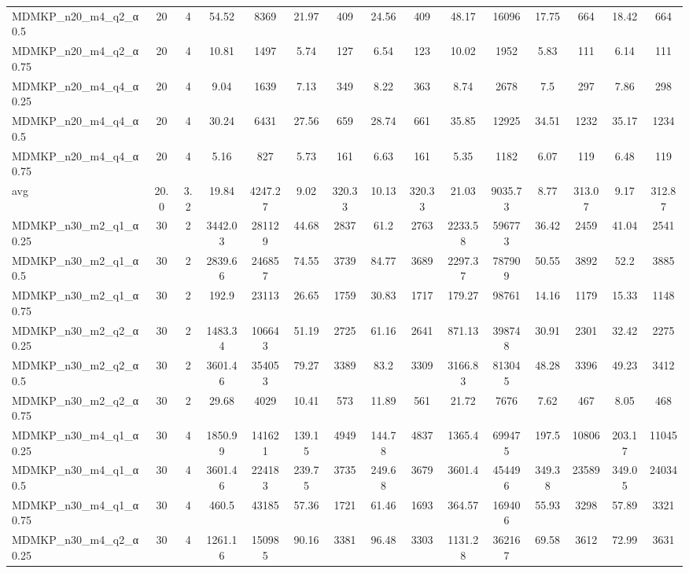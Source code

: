 \begin{table}[!ht]
{\begin{tabular}{lcccccccccccccc}
MDMKP\_n20\_m4\_q2\_α0.5 & 20 & 4 & 54.52 & 8369 & 21.97 & 409 & 24.56 & 409 & 48.17 & 16096 & 17.75 & 664 & 18.42 & 664 \\
MDMKP\_n20\_m4\_q2\_α0.75 & 20 & 4 & 10.81 & 1497 & 5.74 & 127 & 6.54 & 123 & 10.02 & 1952 & 5.83 & 111 & 6.14 & 111 \\
MDMKP\_n20\_m4\_q4\_α0.25 & 20 & 4 & 9.04 & 1639 & 7.13 & 349 & 8.22 & 363 & 8.74 & 2678 & 7.5 & 297 & 7.86 & 298 \\
MDMKP\_n20\_m4\_q4\_α0.5 & 20 & 4 & 30.24 & 6431 & 27.56 & 659 & 28.74 & 661 & 35.85 & 12925 & 34.51 & 1232 & 35.17 & 1234 \\
MDMKP\_n20\_m4\_q4\_α0.75 & 20 & 4 & 5.16 & 827 & 5.73 & 161 & 6.63 & 161 & 5.35 & 1182 & 6.07 & 119 & 6.48 & 119 \\
\hline avg & 20.0 & 3.2 & 19.84& 4247.27 & 9.02& 320.33 & 10.13& 320.33 & 21.03& 9035.73 & 8.77& 313.07 & 9.17& 312.87\\ \hline
MDMKP\_n30\_m2\_q1\_α0.25 & 30 & 2 & 3442.03 & 281129 & 44.68 & 2837 & 61.2 & 2763 & 2233.58 & 596773 & 36.42 & 2459 & 41.04 & 2541 \\
MDMKP\_n30\_m2\_q1\_α0.5 & 30 & 2 & 2839.66 & 246857 & 74.55 & 3739 & 84.77 & 3689 & 2297.37 & 787909 & 50.55 & 3892 & 52.2 & 3885 \\
MDMKP\_n30\_m2\_q1\_α0.75 & 30 & 2 & 192.9 & 23113 & 26.65 & 1759 & 30.83 & 1717 & 179.27 & 98761 & 14.16 & 1179 & 15.33 & 1148 \\
MDMKP\_n30\_m2\_q2\_α0.25 & 30 & 2 & 1483.34 & 106643 & 51.19 & 2725 & 61.16 & 2641 & 871.13 & 398748 & 30.91 & 2301 & 32.42 & 2275 \\
MDMKP\_n30\_m2\_q2\_α0.5 & 30 & 2 & 3601.46 & 354053 & 79.27 & 3389 & 83.2 & 3309 & 3166.83 & 813045 & 48.28 & 3396 & 49.23 & 3412 \\
MDMKP\_n30\_m2\_q2\_α0.75 & 30 & 2 & 29.68 & 4029 & 10.41 & 573 & 11.89 & 561 & 21.72 & 7676 & 7.62 & 467 & 8.05 & 468 \\
MDMKP\_n30\_m4\_q1\_α0.25 & 30 & 4 & 1850.99 & 141621 & 139.15 & 4949 & 144.78 & 4837 & 1365.4 & 699475 & 197.5 & 10806 & 203.17 & 11045 \\
MDMKP\_n30\_m4\_q1\_α0.5 & 30 & 4 & 3601.46 & 224183 & 239.75 & 3735 & 249.68 & 3679 & 3601.4 & 454496 & 349.38 & 23589 & 349.05 & 24034 \\
MDMKP\_n30\_m4\_q1\_α0.75 & 30 & 4 & 460.5 & 43185 & 57.36 & 1721 & 61.46 & 1693 & 364.57 & 169406 & 55.93 & 3298 & 57.89 & 3321 \\
MDMKP\_n30\_m4\_q2\_α0.25 & 30 & 4 & 1261.16 & 150985 & 90.16 & 3381 & 96.48 & 3303 & 1131.28 & 362167 & 69.58 & 3612 & 72.99 & 3631 \\

\end{tabular}}
\end{table}
